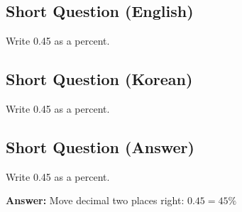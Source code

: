 \cleardoublepage
\subsection*{Short Question (English)}
Write 0.45 as a percent.


\newpage
\subsection*{Short Question (Korean)}
Write 0.45 as a percent.


\newpage
\subsection*{Short Question (Answer)}
Write 0.45 as a percent.

\textbf{Answer:} Move decimal two places right: $0.45 = 45\%$
